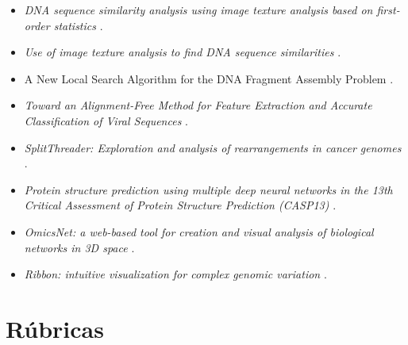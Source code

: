 \documentclass{article}
\begin{document}
\begin{itemize}
	\item \textit{DNA sequence similarity analysis using image texture analysis based
	on first-order statistics} \cite{delibacs2020dna}.
	\item \textit{Use of image texture analysis to find DNA sequence similarities} \cite{chen2018use}.
	\item A New Local Search Algorithm for the DNA
	Fragment Assembly Problem \cite{alba2007new}.
	\item \textit{Toward an Alignment-Free Method for Feature Extraction
	and Accurate Classification of Viral Sequences} \cite{lebatteux2019toward}.

	\item \textit{SplitThreader: Exploration and analysis of rearrangements in cancer genomes} \cite{nattestad2016splitthreader}.
	
	\item \textit{Protein structure prediction using multiple deep neural
		networks in the 13th Critical Assessment of Protein
		Structure Prediction (CASP13)} \cite{senior2019protein}.
	
	\item \textit{OmicsNet: a web-based tool for creation and visual
		analysis of biological networks in 3D space} \cite{zhou2018omicsnet}.
	
	\item \textit{Ribbon: intuitive visualization for complex genomic variation} \cite{nattestad2021ribbon}.
	
\end{itemize}


\section{Rúbricas}
\end{document}
